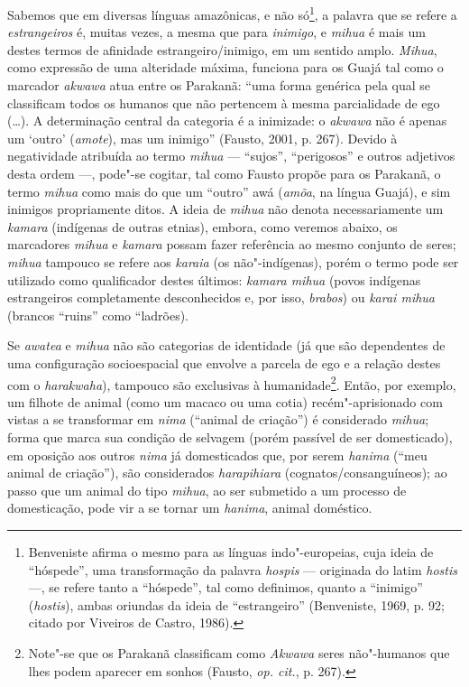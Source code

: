 Sabemos que em diversas línguas amazônicas, e não só\footnote{Benveniste
  afirma o mesmo para as línguas indo"-europeias, cuja ideia de
  ``hóspede'', uma transformação da palavra \emph{hospis} --- originada do
  latim \emph{hostis} ---, se refere tanto a ``hóspede'', tal como
  definimos, quanto a ``inimigo'' (\emph{hostis}), ambas oriundas da ideia
  de ``estrangeiro'' (Benveniste, 1969, p. 92; citado por Viveiros de Castro,
  1986).}, a palavra que se refere a \emph{estrangeiros} é, muitas
vezes, a mesma que para \emph{inimigo}, e \emph{mihua} é mais um destes
termos de afinidade estrangeiro/inimigo, em um sentido amplo.
\emph{Mihua}, como expressão de uma alteridade máxima, funciona para os
Guajá tal como o marcador \emph{akwawa} atua entre os Parakanã: ``uma
forma genérica pela qual se classificam todos os humanos que não
pertencem à mesma parcialidade de ego (\ldots{}). A determinação central da
categoria é a inimizade: o \emph{akwawa} não é apenas um `outro'
(\emph{amote}), mas um inimigo'' (Fausto, 2001, p. 267). Devido à
negatividade atribuída ao termo \emph{mihua} --- ``sujos'', ``perigosos'' e
outros adjetivos desta ordem ---, pode"-se cogitar, tal como Fausto propõe
para os Parakanã, o termo \emph{mihua} como mais do que um ``outro'' awá
(\emph{amõa}, na língua Guajá), e sim inimigos propriamente ditos. A
ideia de \emph{mihua} não denota necessariamente um \emph{kamara}
(indígenas de outras etnias), embora, como veremos abaixo, os marcadores
\emph{mihua} e \emph{kamara} possam fazer referência ao mesmo conjunto
de seres; \emph{mihua} tampouco se refere aos \emph{karaia} (os
não"-indígenas), porém o termo pode ser utilizado como qualificador
destes últimos: \emph{kamara mihua} (povos indígenas estrangeiros
completamente desconhecidos e, por isso, \emph{brabos}) ou \emph{karai
mihua} (brancos ``ruins'' como ``ladrões).

Se \emph{awatea} e \emph{mihua} não são categorias de identidade (já que
são dependentes de uma configuração socioespacial que envolve a parcela
de ego e a relação destes com o \emph{harakwaha}), tampouco são
exclusivas à humanidade\footnote{Note"-se que os Parakanã classificam
  como \emph{Akwawa} seres não"-humanos que lhes podem aparecer em
  sonhos (Fausto, \emph{op. cit.}, p. 267).}. Então, por exemplo, um filhote de
animal (como um macaco ou uma cotia) recém"-aprisionado com vistas a se
transformar em \emph{nima} (``animal de criação'') é considerado
\emph{mihua}; forma que marca sua condição de selvagem (porém passível
de ser domesticado), em oposição aos outros \emph{nima} já domesticados
que, por serem \emph{hanima} (``meu animal de criação''), são considerados
\emph{harapihiara} (cognatos/consanguíneos); ao passo que um animal do
tipo \emph{mihua}, ao ser submetido a um processo de domesticação, pode
vir a se tornar um \emph{hanima}, animal doméstico.

